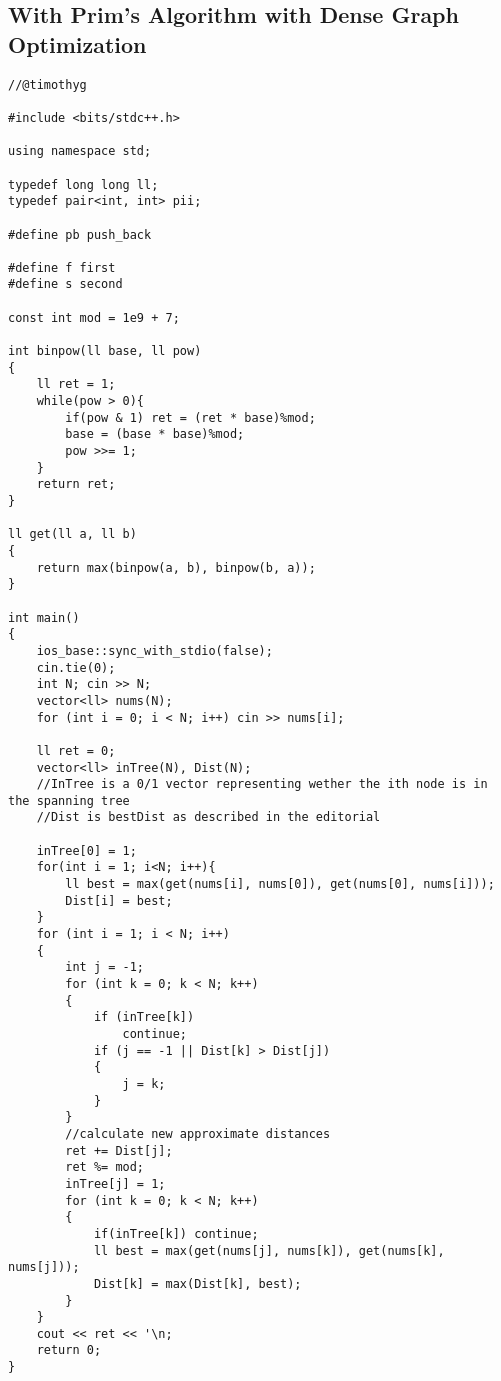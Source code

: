\documentclass[15pt]{article}
\begin{document}
\subsection{With Prim's Algorithm with Dense Graph Optimization}
\begin{lstlisting}
//@timothyg

#include <bits/stdc++.h>

using namespace std;

typedef long long ll;
typedef pair<int, int> pii;

#define pb push_back

#define f first
#define s second

const int mod = 1e9 + 7;

int binpow(ll base, ll pow)
{
    ll ret = 1;
    while(pow > 0){
        if(pow & 1) ret = (ret * base)%mod;
        base = (base * base)%mod;
        pow >>= 1;
    }
    return ret;
}

ll get(ll a, ll b)
{
    return max(binpow(a, b), binpow(b, a));
}

int main()
{
    ios_base::sync_with_stdio(false);
    cin.tie(0);
    int N; cin >> N;
    vector<ll> nums(N);
    for (int i = 0; i < N; i++) cin >> nums[i];

    ll ret = 0;
    vector<ll> inTree(N), Dist(N);
    //InTree is a 0/1 vector representing wether the ith node is in the spanning tree
    //Dist is bestDist as described in the editorial
    
    inTree[0] = 1;
    for(int i = 1; i<N; i++){
        ll best = max(get(nums[i], nums[0]), get(nums[0], nums[i]));
        Dist[i] = best;
    }
    for (int i = 1; i < N; i++)
    {
        int j = -1;
        for (int k = 0; k < N; k++)
        {
            if (inTree[k])
                continue;
            if (j == -1 || Dist[k] > Dist[j])
            {
                j = k;
            }
        }
        //calculate new approximate distances
        ret += Dist[j];
        ret %= mod;
        inTree[j] = 1;
        for (int k = 0; k < N; k++)
        {
            if(inTree[k]) continue;
            ll best = max(get(nums[j], nums[k]), get(nums[k], nums[j]));
            Dist[k] = max(Dist[k], best);
        }
    }
    cout << ret << '\n;
    return 0;
}
\end{lstlisting}
\end{document}
